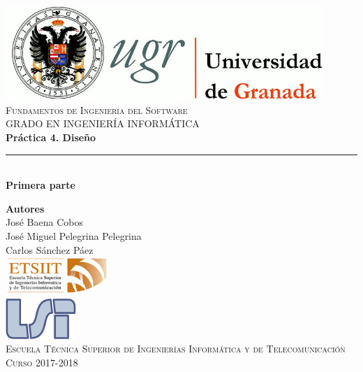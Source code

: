 \documentclass[12pt,spanish]{article}
\begin{document}
\begin{titlepage}

\newlength{\centeroffset}
\setlength{\centeroffset}{-0.5\oddsidemargin}
\addtolength{\centeroffset}{0.5\evensidemargin}
\thispagestyle{empty}

\noindent\hspace*{\centeroffset}\begin{minipage}{\textwidth}

\centering
\includegraphics[width=0.9\textwidth]{logo_ugr.jpg}\\[1.4cm]

\textsc{ \Large Fundamentos de Ingeniería del Software\\[0.2cm]}
\textsc{GRADO EN INGENIERÍA INFORMÁTICA}\\[1cm]

{\Large\bfseries Práctica 4. Diseño\\
}
\noindent\rule[-1ex]{\textwidth}{3pt}\\[3.5ex]
{\normalsize\bfseries Primera parte}
\end{minipage}

\vspace{2.5cm}
\noindent\hspace*{\centeroffset}
\begin{minipage}{\textwidth}
\centering

\textbf{Autores}\\ {José Baena Cobos \\ José Miguel Pelegrina Pelegrina\\Carlos Sánchez Páez}\\[2.5ex]
\includegraphics[width=0.3\textwidth]{etsiit_logo.png}\\[0.1cm]
\vspace{1.5cm}
\includegraphics[width=0.2\textwidth]{lsi.png}\\[0.1cm]
\vspace{1cm}
\textsc{Escuela Técnica Superior de Ingenierías Informática y de Telecomunicación}\\
\vspace{1cm}
\textsc{Curso 2017-2018}
\end{minipage}
\end{titlepage}
\tableofcontents
\thispagestyle{empty}
\listoffigures
\newpage
\setcounter{page}{1}
\end{document}
